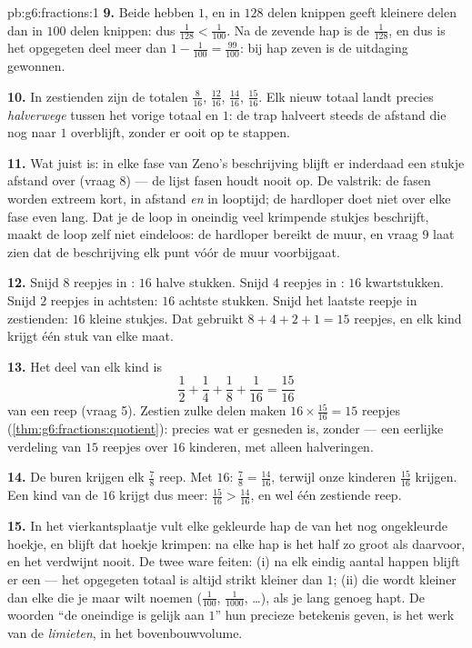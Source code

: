 \begin{solution}{pb:g6:fractions:1}
\textbf{9.} Beide  hebben  $1$, en in $128$ delen knippen geeft
kleinere delen dan in $100$ delen knippen: dus $\frac{1}{128} < \frac{1}{100}$.
Na de zevende hap is de  $\frac{1}{128}$, en dus is het opgegeten deel meer
dan $1 - \frac{1}{100} = \frac{99}{100}$: bij hap zeven is de uitdaging
gewonnen.

\textbf{10.} In zestienden zijn de totalen $\frac{8}{16}$, $\frac{12}{16}$,
$\frac{14}{16}$, $\frac{15}{16}$. Elk nieuw totaal landt precies
\emph{halverwege} tussen het vorige totaal en $1$: de trap halveert steeds de
afstand die nog naar $1$ overblijft, zonder er ooit op te stappen.

\textbf{11.} Wat juist is: in elke fase van Zeno's beschrijving blijft er
inderdaad een stukje afstand over (vraag 8) --- de lijst fasen houdt nooit op.
De valstrik: de fasen worden extreem kort, in afstand \emph{en} in looptijd; de
hardloper doet niet over elke fase even lang. Dat je de loop in oneindig veel
krimpende stukjes beschrijft, maakt de loop zelf niet eindeloos: de hardloper
bereikt de muur, en vraag 9 laat zien dat de beschrijving elk punt vóór de muur
voorbijgaat.

\textbf{12.} Snijd $8$ reepjes in : $16$ halve stukken. Snijd $4$
reepjes in : $16$ kwartstukken. Snijd $2$ reepjes in achtsten: $16$
achtste stukken. Snijd het laatste reepje in zestienden: $16$ kleine stukjes.
Dat gebruikt $8 + 4 + 2 + 1 = 15$ reepjes, en elk kind krijgt één stuk van elke
maat.

\textbf{13.} Het deel van elk kind is
\[
\frac12 + \frac14 + \frac18 + \frac{1}{16} = \frac{15}{16}
\]
van een reep (vraag 5). Zestien zulke delen maken
$16 \times \frac{15}{16} = 15$ reepjes
(\cref{thm:g6:fractions:quotient}): precies wat er gesneden is, zonder  ---
een eerlijke verdeling van $15$ reepjes over $16$ kinderen, met alleen
halveringen.

\textbf{14.} De buren krijgen elk $\frac78$ reep. Met  $16$:
$\frac78 = \frac{14}{16}$, terwijl onze kinderen $\frac{15}{16}$ krijgen. Een
kind van de $16$ krijgt dus meer: $\frac{15}{16} > \frac{14}{16}$, en wel één
zestiende reep.

\textbf{15.} In het vierkantsplaatje vult elke gekleurde hap de  van het
nog ongekleurde hoekje, en blijft dat hoekje krimpen: na elke hap is het half
zo groot als daarvoor, en het verdwijnt nooit. De twee ware feiten: (i) na elk
eindig aantal happen blijft er een  --- het opgegeten totaal is altijd
strikt kleiner dan $1$; (ii) die  wordt kleiner dan elke  die je maar
wilt noemen ($\frac{1}{100}$, $\frac{1}{1000}$, \dots), als je lang genoeg
hapt. De woorden ``de oneindige  is gelijk aan $1$'' hun precieze betekenis
geven, is het werk van de \emph{limieten}, in het bovenbouwvolume.
\end{solution}
